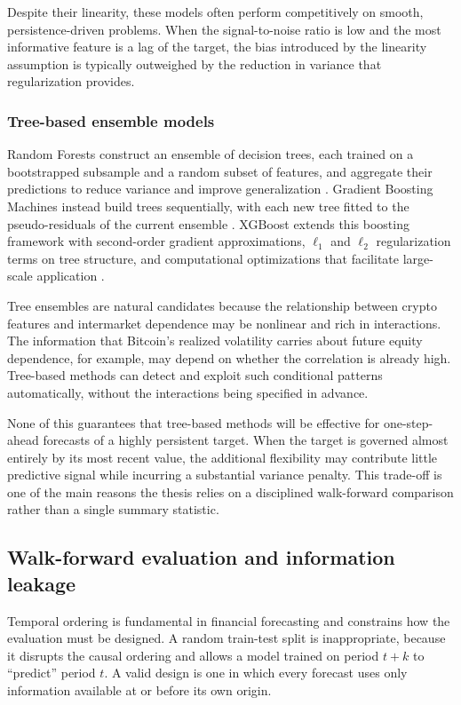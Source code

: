 Despite their linearity, these models often perform competitively on smooth, persistence-driven problems. When the signal-to-noise ratio is low and the most informative feature is a lag of the target, the bias introduced by the linearity assumption is typically outweighed by the reduction in variance that regularization provides.

\subsubsection{Tree-based ensemble models}

Random Forests construct an ensemble of decision trees, each trained on a bootstrapped subsample and a random subset of features, and aggregate their predictions to reduce variance and improve generalization \cite{breiman2001}. Gradient Boosting Machines instead build trees sequentially, with each new tree fitted to the pseudo-residuals of the current ensemble \cite{friedman2001}. XGBoost extends this boosting framework with second-order gradient approximations, $\ell_1$ and $\ell_2$ regularization terms on tree structure, and computational optimizations that facilitate large-scale application \cite{chen2016}.

Tree ensembles are natural candidates because the relationship between crypto features and intermarket dependence may be nonlinear and rich in interactions. The information that Bitcoin's realized volatility carries about future equity dependence, for example, may depend on whether the correlation is already high. Tree-based methods can detect and exploit such conditional patterns automatically, without the interactions being specified in advance.

None of this guarantees that tree-based methods will be effective for one-step-ahead forecasts of a highly persistent target. When the target is governed almost entirely by its most recent value, the additional flexibility may contribute little predictive signal while incurring a substantial variance penalty. This trade-off is one of the main reasons the thesis relies on a disciplined walk-forward comparison rather than a single summary statistic.

\subsection{Walk-forward evaluation and information leakage}

Temporal ordering is fundamental in financial forecasting and constrains how the evaluation must be designed. A random train-test split is inappropriate, because it disrupts the causal ordering and allows a model trained on period $t + k$ to ``predict'' period $t$. A valid design is one in which every forecast uses only information available at or before its own origin.

